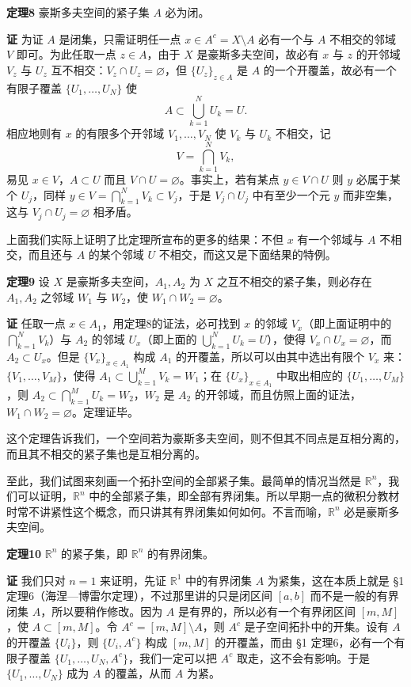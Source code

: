 \noindent\textbf{定理8}\quad
豪斯多夫空间的紧子集 $A$ 必为闭。

\noindent\textbf{证}\quad
为证 $A$ 是闭集，只需证明任一点 $x\in A^c=X\setminus A$ 必有一个与 $A$ 不相交的邻域 $V$ 即可。为此任取一点 $z\in A$，由于 $X$ 是豪斯多夫空间，故必有 $x$ 与 $z$ 的开邻域 $V_z$ 与 $U_z$ 互不相交：$V_z\cap U_z=\varnothing$，但 $\{U_z\}_{z\in A}$ 是 $A$ 的一个开覆盖，故必有一个有限子覆盖 $\{U_1,\ldots,U_N\}$ 使
\[
 A\subset\bigcup_{k=1}^N U_k=U.
\]
相应地则有 $x$ 的有限多个开邻域 $V_1,\ldots,V_N$ 使 $V_k$ 与 $U_k$ 不相交，记
\[
 V=\bigcap_{k=1}^N V_k,
\]
易见 $x\in V$，$A\subset U$ 而且 $V\cap U=\varnothing$。事实上，若有某点 $y\in V\cap U$ 则 $y$ 必属于某个 $U_j$，同样 $y\in V=\bigcap_{k=1}^N V_k\subset V_j$，于是 $V_j\cap U_j$ 中有至少一个元 $y$ 而非空集，这与 $V_j\cap U_j=\varnothing$ 相矛盾。

上面我们实际上证明了比定理所宣布的更多的结果：不但 $x$ 有一个邻域与 $A$ 不相交，而且还与 $A$ 的某个邻域 $U$ 不相交，而这又是下面结果的特例。

\noindent\textbf{定理9}\quad
设 $X$ 是豪斯多夫空间，$A_1,A_2$ 为 $X$ 之互不相交的紧子集，则必存在 $A_1,A_2$ 之邻域 $W_1$ 与 $W_2$，使 $W_1\cap W_2=\varnothing$。

\noindent\textbf{证}\quad
任取一点 $x\in A_1$，用定理8的证法，必可找到 $x$ 的邻域 $V_x$（即上面证明中的 $\bigcap_{k=1}^N V_k$）与 $A_2$ 的邻域 $U_x$（即上面的 $\bigcup_{k=1}^N U_k=U$），使得 $V_x\cap U_x=\varnothing$，而 $A_2\subset U_x$。但是 $\{V_x\}_{x\in A_1}$ 构成 $A_1$ 的开覆盖，所以可以由其中选出有限个 $V_x$ 来：$\{V_1,\ldots,V_M\}$，使得 $A_1\subset\bigcup_{k=1}^M V_k=W_1$；在 $\{U_x\}_{x\in A_1}$ 中取出相应的 $\{U_1,\ldots,U_M\}$，则 $A_2\subset\bigcap_{k=1}^M U_k=W_2$，$W_2$ 是 $A_2$ 的开邻域，而且仿照上面的证法，$W_1\cap W_2=\varnothing$。定理证毕。

这个定理告诉我们，一个空间若为豪斯多夫空间，则不但其不同点是互相分离的，而且其不相交的紧子集也是互相分离的。

至此，我们试图来刻画一个拓扑空间的全部紧子集。最简单的情况当然是 $\mathbb R^n$，我们可以证明，$\mathbb R^n$ 中的全部紧子集，即全部有界闭集。所以早期一点的微积分教材时常不讲紧性这个概念，而只讲其有界闭集如何如何。不言而喻，$\mathbb R^n$ 必是豪斯多夫空间。

\noindent\textbf{定理10}\quad
$\mathbb R^n$ 的紧子集，即 $\mathbb R^n$ 的有界闭集。

\noindent\textbf{证}\quad
我们只对 $n=1$ 来证明，先证 $\mathbb R^1$ 中的有界闭集 $A$ 为紧集，这在本质上就是 §1 定理6（海涅—博雷尔定理），不过那里讲的只是闭区间 $[a,b]$ 而不是一般的有界闭集 $A$，所以要稍作修改。因为 $A$ 是有界的，所以必有一个有界闭区间 $[m,M]$，使 $A\subset[m,M]$。令 $A^c=[m,M]\setminus A$，则 $A^c$ 是子空间拓扑中的开集。设有 $A$ 的开覆盖 $\{U_i\}$，则 $\{U_i,A^c\}$ 构成 $[m,M]$ 的开覆盖，而由 §1 定理6，必有一个有限子覆盖 $\{U_1,\ldots,U_N,A^c\}$，我们一定可以把 $A^c$ 取走，这不会有影响。于是 $\{U_1,\ldots,U_N\}$ 成为 $A$ 的覆盖，从而 $A$ 为紧。

